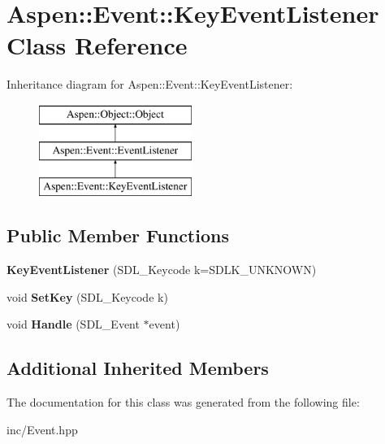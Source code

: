 \hypertarget{class_aspen_1_1_event_1_1_key_event_listener}{\section{Aspen\-:\-:Event\-:\-:Key\-Event\-Listener Class Reference}
\label{class_aspen_1_1_event_1_1_key_event_listener}
}
Inheritance diagram for Aspen\-:\-:Event\-:\-:Key\-Event\-Listener\-:\begin{figure}[H]
\begin{center}
\leavevmode
\includegraphics[height=3.000000cm]{d3/dd2/class_aspen_1_1_event_1_1_key_event_listener}
\end{center}
\end{figure}
\subsection*{Public Member Functions}
\begin{DoxyCompactItemize}
\item 
\hypertarget{class_aspen_1_1_event_1_1_key_event_listener_a0affd7ca59069ef53b50cf6af6194c33}{{\bfseries Key\-Event\-Listener} (S\-D\-L\-\_\-\-Keycode k=S\-D\-L\-K\-\_\-\-U\-N\-K\-N\-O\-W\-N)}\label{class_aspen_1_1_event_1_1_key_event_listener_a0affd7ca59069ef53b50cf6af6194c33}

\item 
\hypertarget{class_aspen_1_1_event_1_1_key_event_listener_a76cd7f4e6b5bd314740c419bbd5e2cc7}{void {\bfseries Set\-Key} (S\-D\-L\-\_\-\-Keycode k)}\label{class_aspen_1_1_event_1_1_key_event_listener_a76cd7f4e6b5bd314740c419bbd5e2cc7}

\item 
\hypertarget{class_aspen_1_1_event_1_1_key_event_listener_aea2a17c4e1c8720a18c8c08c21510cad}{void {\bfseries Handle} (S\-D\-L\-\_\-\-Event $\ast$event)}\label{class_aspen_1_1_event_1_1_key_event_listener_aea2a17c4e1c8720a18c8c08c21510cad}

\end{DoxyCompactItemize}
\subsection*{Additional Inherited Members}


The documentation for this class was generated from the following file\-:\begin{DoxyCompactItemize}
\item 
inc/Event.\-hpp\end{DoxyCompactItemize}
